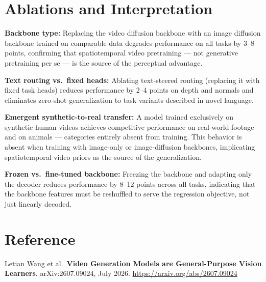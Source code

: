 \documentclass[10pt,twocolumn]{article}
\begin{document}
\section{Ablations and Interpretation}

\textbf{Backbone type:} Replacing the video diffusion backbone with
an image diffusion backbone trained on comparable data degrades
performance on all tasks by 3--8 points, confirming that spatiotemporal
video pretraining --- not generative pretraining per se --- is the
source of the perceptual advantage.

\textbf{Text routing vs.\ fixed heads:} Ablating text-steered routing
(replacing it with fixed task heads) reduces performance by 2--4
points on depth and normals and eliminates zero-shot generalization
to task variants described in novel language.

\textbf{Emergent synthetic-to-real transfer:} A model trained
exclusively on synthetic human videos achieves competitive
performance on real-world footage and on animals --- categories
entirely absent from training.
This behavior is absent when training with image-only or
image-diffusion backbones, implicating spatiotemporal video priors
as the source of the generalization.

\textbf{Frozen vs.\ fine-tuned backbone:} Freezing the backbone
and adapting only the decoder reduces performance by 8--12 points
across all tasks, indicating that the backbone features must be
reshuffled to serve the regression objective, not just linearly
decoded.

\section*{Reference}

Letian Wang et al.\
\textbf{Video Generation Models are General-Purpose Vision Learners}.
arXiv:2607.09024, July 2026.
\url{https://arxiv.org/abs/2607.09024}
\end{document}
